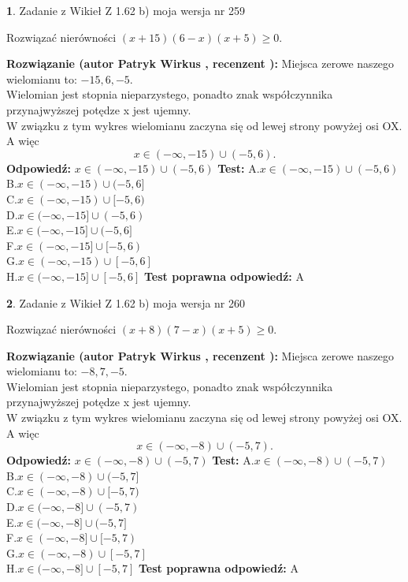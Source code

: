 \documentclass[12pt, a4paper]{article}
\theoremstyle{definition} %
\newtheorem{zad}{}
\newcommand{\zadStart}[1]{\begin{zad}#1\newline}
\newcommand{\zadStop}{\end{zad}}
\newcommand{\rozwStart}[2]{\noindent \textbf{Rozwiązanie (autor #1 , recenzent #2): }\newline}
\newcommand{\rozwStop}{\newline}
\newcommand{\odpStart}{\noindent \textbf{Odpowiedź:}\newline}
\newcommand{\odpStop}{\newline}
\newcommand{\testStart}{\noindent \textbf{Test:}\newline}
\newcommand{\testStop}{\newline}
\newcommand{\kluczStart}{\noindent \textbf{Test poprawna odpowiedź:}\newline}
\newcommand{\kluczStop}{\newline}
\begin{document}
\zadStart{Zadanie z Wikieł Z 1.62 b) moja wersja nr 259}

Rozwiązać nierówności $(x+15)(6-x)(x+5)\ge0$.
\zadStop
\rozwStart{Patryk Wirkus}{}
Miejsca zerowe naszego wielomianu to: $-15, 6, -5$.\\
Wielomian jest stopnia nieparzystego, ponadto znak współczynnika przy\linebreak najwyższej potędze x jest ujemny.\\ W związku z tym wykres wielomianu zaczyna się od lewej strony powyżej osi OX. A więc $$x \in (-\infty,-15) \cup (-5,6).$$
\rozwStop
\odpStart
$x \in (-\infty,-15) \cup (-5,6)$
\odpStop
\testStart
A.$x \in (-\infty,-15) \cup (-5,6)$\\
B.$x \in (-\infty,-15) \cup (-5,6]$\\
C.$x \in (-\infty,-15) \cup [-5,6)$\\
D.$x \in (-\infty,-15] \cup (-5,6)$\\
E.$x \in (-\infty,-15] \cup (-5,6]$\\
F.$x \in (-\infty,-15] \cup [-5,6)$\\
G.$x \in (-\infty,-15) \cup [-5,6]$\\
H.$x \in (-\infty,-15] \cup [-5,6]$
\testStop
\kluczStart
A
\kluczStop



\zadStart{Zadanie z Wikieł Z 1.62 b) moja wersja nr 260}

Rozwiązać nierówności $(x+8)(7-x)(x+5)\ge0$.
\zadStop
\rozwStart{Patryk Wirkus}{}
Miejsca zerowe naszego wielomianu to: $-8, 7, -5$.\\
Wielomian jest stopnia nieparzystego, ponadto znak współczynnika przy\linebreak najwyższej potędze x jest ujemny.\\ W związku z tym wykres wielomianu zaczyna się od lewej strony powyżej osi OX. A więc $$x \in (-\infty,-8) \cup (-5,7).$$
\rozwStop
\odpStart
$x \in (-\infty,-8) \cup (-5,7)$
\odpStop
\testStart
A.$x \in (-\infty,-8) \cup (-5,7)$\\
B.$x \in (-\infty,-8) \cup (-5,7]$\\
C.$x \in (-\infty,-8) \cup [-5,7)$\\
D.$x \in (-\infty,-8] \cup (-5,7)$\\
E.$x \in (-\infty,-8] \cup (-5,7]$\\
F.$x \in (-\infty,-8] \cup [-5,7)$\\
G.$x \in (-\infty,-8) \cup [-5,7]$\\
H.$x \in (-\infty,-8] \cup [-5,7]$
\testStop
\kluczStart
A
\kluczStop
\end{document}
